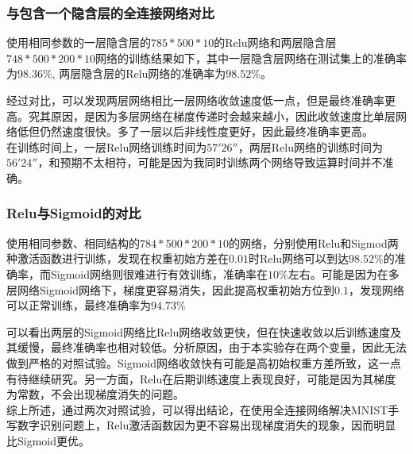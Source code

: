 \documentclass[11pt,utf8]{article}
\begin{document}
          \subsubsection*{与包含一个隐含层的全连接网络对比}
            \indent 使用相同参数的一层隐含层的$785*500*10$的Relu网络和两层隐含层$748*500*200*10$网络的训练结果如下，其中一层隐含层网络在测试集上的准确率为$98.36\%$, 两层隐含层的Relu网络的准确率为$98.52\%$。
            \begin{center}
              \vspace{2em}
            \end{center}
            \indent \indent 经过对比，可以发现两层网络相比一层网络收敛速度低一点，但是最终准确率更高。究其原因，是因为多层网络在梯度传递时会越来越小，因此收敛速度比单层网络低但仍然速度很快。多了一层以后非线性度更好，因此最终准确率更高。\\
            \indent 在训练时间上，一层Relu网络训练时间为$57'26''$，两层Relu网络的训练时间为$56'24''$，和预期不太相符，可能是因为我同时训练两个网络导致运算时间并不准确。
          \subsubsection*{Relu与Sigmoid的对比}
            使用相同参数、相同结构的$784*500*200*10$的网络，分别使用Relu和Sigmod两种激活函数进行训练，发现在权重初始方差在$0.01$时Relu网络可以到达$98.52\%$的准确率，而Sigmoid网络则很难进行有效训练，准确率在$10\%$左右。可能是因为在多层网络Sigmoid网络下，梯度更容易消失，因此提高权重初始方位到$0.1$，发现网络可以正常训练，最终准确率为$94.73\%$
            \begin{center}
              \vspace{2em}
            \end{center}
            \indent \indent 可以看出两层的Sigmoid网络比Relu网络收敛更快，但在快速收敛以后训练速度及其缓慢，最终准确率也相对较低。分析原因，由于本实验存在两个变量，因此无法做到严格的对照试验。Sigmoid网络收敛快有可能是高初始权重方差所致，这一点有待继续研究。另一方面，Relu在后期训练速度上表现良好，可能是因为其梯度为常数，不会出现梯度消失的问题。\\
            \indent 综上所述，通过两次对照试验，可以得出结论，在使用全连接网络解决MNIST手写数字识别问题上，Relu激活函数因为更不容易出现梯度消失的现象，因而明显比Sigmoid更优。
\end{document}
